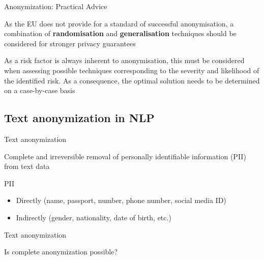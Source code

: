 \documentclass[12pt,aspectratio=169,handout]{beamer}
\begin{document}
\begin{frame}{Anonymization: Practical Advice}

As the EU does not provide for a standard of successful anonymisation, a combination of \textbf{randomisation} and \textbf{generalisation} techniques should be considered for stronger privacy guarantees

As a risk factor is always inherent to anonymisation, this must be considered when assessing possible techniques corresponding to the severity and likelihood of the identified risk. As a consequence, the optimal solution needs to be determined on a case-by-case basis

\citep[p.~14]{Voigt.Bussche.2017}

\end{frame}




\subsection{Text anonymization in NLP}

\begin{frame}{Text anonymization}

Complete and irreversible removal of personally identifiable information (PII) from text data

\begin{block}{PII}
\begin{itemize}
\item Directly (name, passport, number, phone number, social media ID)
\item Indirectly (gender, nationality, date of birth, etc.)
\end{itemize}
\end{block}

	
\end{frame}


\begin{frame}{Text anonymization}

Is complete anonymization possible?

	
\end{frame}
\end{document}

